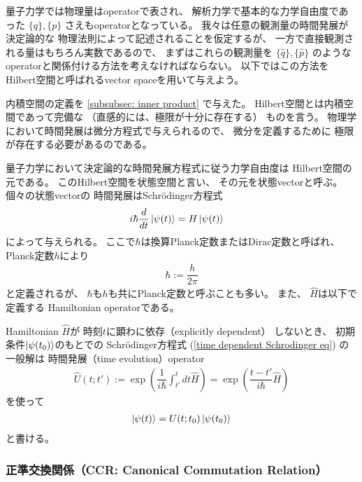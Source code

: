 量子力学では物理量はoperatorで表され、
解析力学で基本的な力学自由度であった
$\{q\},\{p\}$
さえもoperatorとなっている。
我々は任意の観測量の時間発展が決定論的な
物理法則によって記述されることを仮定するが、
一方で直接観測される量はもちろん実数であるので、
まずはこれらの観測量を
$\{\hat{q}\},\{\hat{p}\}$
のようなoperatorと関係付ける方法を考えなければならない。
以下ではこの方法を
Hilbert空間と呼ばれるvector spaceを用いて与えよう。

内積空間の定義を
\ref{subsubsec: inner product}
で与えた。
Hilbert空間とは内積空間であって完備な
（直感的には、極限が十分に存在する）
ものを言う。
物理学において時間発展は微分方程式で与えられるので、
微分を定義するために
極限が存在する必要があるのである。

量子力学において決定論的な時間発展方程式に従う力学自由度は
Hilbert空間の元である。
このHilbert空間を状態空間と言い、
その元を状態vectorと呼ぶ。
個々の状態vectorの
時間発展はSchr\"odinger方程式
\begin{align}
    i\hbar \dfrac{d}{dt}
        \ket{\psi(t)}
&=
    H \ket{\psi(t)}
\label{time dependent Schrodinger eq}
\end{align}
によって与えられる。
ここで$\hbar$は換算Planck定数またはDirac定数と呼ばれ、
Planck定数$h$により
\begin{align}
    \hbar := \dfrac{h}{2\pi}
\end{align}
と定義されるが、
$\hbar$も$h$も共にPlanck定数と呼ぶことも多い。
また、
$\hat{H}$は以下で定義する
Hamiltonian operatorである。

Hamiltonian $\hat{H}$が
時刻$t$に顕わに依存（explicitly dependent）
しないとき、
初期条件$\ket{ \psi(t_0) }$のもとでの
Schr\"odinger方程式
(\ref{time dependent Schrodinger eq})
の一般解は
時間発展（time evolution）operator
\begin{align}
    \hat{U}(t;t')
    :=
    \exp\left(
        \dfrac{1}{i \hbar}
        \int_{t'}^{t}dt
        \hat{H}
    \right)
    =
    \exp\left(
        \dfrac{t - t'}{i \hbar}
        \hat{H}
    \right)
\label{time evolution operator}
\end{align}
を使って
\begin{align}
    \ket{ \psi(t) }
    =
    U (t;t_0)
    \ket{ \psi(t_0) }
\label{time dependent solution for Schrodinger eq}
\end{align}
と書ける。

\subsubsection{正準交換関係（CCR: Canonical Commutation Relation）}
\label{subsubsec: CCR}

